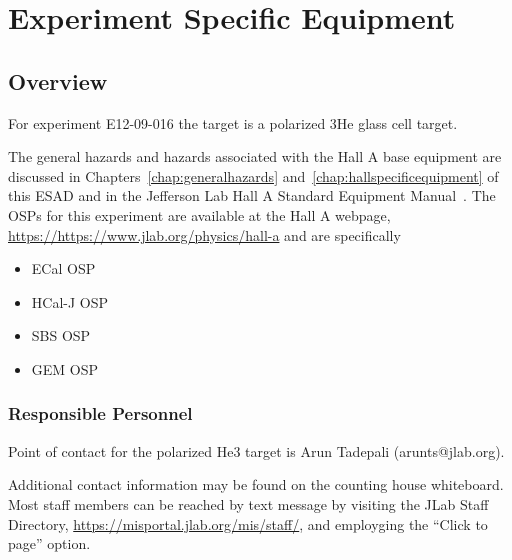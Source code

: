 \chapter{Experiment Specific Equipment}
\label{chap:expspecific}



\section{Overview}
For experiment E12-09-016 the target is a polarized 3He glass cell target.

The general hazards and hazards associated with the Hall A base
equipment are discussed in Chapters~\ref{chap:generalhazards}
and~\ref{chap:hallspecificequipment} of this ESAD and in the Jefferson
Lab Hall A Standard Equipment Manual~\cite{HallAosp}.
The OSPs for this experiment are available at the Hall A webpage, \url{https://https://www.jlab.org/physics/hall-a} and are specifically
\begin{itemize}
\item{ECal OSP}
\item{HCal-J OSP}
\item{SBS OSP}
\item{GEM OSP}
\end{itemize}
\subsection{Responsible Personnel}

Point of contact for the polarized He3 target is Arun Tadepali (arunts@jlab.org).

Additional contact information may be found on the counting house
whiteboard.  Most staff members can be reached by text message by
visiting the JLab Staff Directory,
\url{https://misportal.jlab.org/mis/staff/}, and employging
the ``Click to page'' option.
